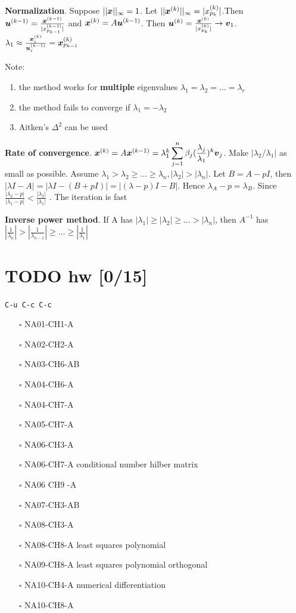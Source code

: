 \documentclass[11pt]{article}
\begin{document}
\textbf{Normalization}. Suppose \(||\boldsymbol{x}||_\infty=1\). Let
\(||\boldsymbol{x}^{(k)}||_\infty=|x_{p_k}^{(k)}|\).Then \(\boldsymbol{u}^{(k-1)}=
   \frac{\boldsymbol{x}^{(k-1)}}{|x_{p_{k-1}}^{(k-1)}|}\) and
\(\boldsymbol{x}^{(k)}=A\boldsymbol{u}^{(k-1)}\).
Then \(\boldsymbol{u}^{(k)}= \frac{\boldsymbol{x}^{(k)}}{|x_{p_k}^{(k)}|}\to \boldsymbol{v}_1\).
\(\lambda_1\approx
   \frac{\boldsymbol{x}_i^{(k)}}{\boldsymbol{u}_i^{(k-1)}}=\boldsymbol{x}_{p_{k-1}}^{(k)}\)

Note:
\begin{enumerate}
\item the method works for \textbf{multiple} eigenvalues
\(\lambda_1=\lambda_2=\dots=\lambda_r\)
\item the method fails to converge if \(\lambda_1=-\lambda_2\)
\item Aitken's \(\Delta^2\) can be used
\end{enumerate}


\textbf{Rate of convergence}. \(\boldsymbol{x}^{(k)}=A\boldsymbol{x}^{(k-1)}=\lambda_1^k
   \displaystyle\sum_{j=1}^n\beta_j(\frac{\lambda_j}{\lambda_1})^k\boldsymbol{v}_j\).
Make \(|\lambda_2/\lambda_1|\) as small as possible.
Assume \(\lambda_1>\lambda_2\ge\dots\ge\lambda_n, |\lambda_2|>|\lambda_n|\).
Let \(B=A-pI\), then \(|\lambda I-A|=|\lambda I-(B+pI)|=|(\lambda-p)I-B|\).
Hence \(\lambda_A-p=\lambda_B\). Since  \(\frac{|\lambda_2-p|}{|\lambda_1-p|}<
   \frac{|\lambda_2|}{|\lambda_1|}\) . The iteration is fast


\textbf{Inverse power method}. If A has
\(|\lambda_1|\ge|\lambda_2|\ge\dots>|\lambda_n|\), then \(A^{-1}\) has
\(|\frac{1}{\lambda_n}|>| \frac{1}{\lambda_{n-1}}|\ge\dots\ge|
   \frac{1}{\lambda_1}|\) 

\section{{\bfseries\sffamily TODO} hw [0/15]}
\label{sec:org5db9d9a}
\texttt{C-u C-c C-c}
\begin{itemize}
\item[{$\square$}] NA01-CH1-A
\item[{$\square$}] NA02-CH2-A
\item[{$\square$}] NA03-CH6-AB
\item[{$\square$}] NA04-CH6-A
\item[{$\square$}] NA04-CH7-A
\item[{$\square$}] NA05-CH7-A
\item[{$\square$}] NA06-CH3-A
\item[{$\square$}] NA06-CH7-A
conditional number
hilber matrix
\item[{$\square$}] NA06 CH9 -A
\item[{$\square$}] NA07-CH3-AB
\item[{$\square$}] NA08-CH3-A
\item[{$\square$}] NA08-CH8-A
least squares polynomial

\item[{$\square$}] NA09-CH8-A
least squares polynomial orthogonal
\item[{$\square$}] NA10-CH4-A
numerical differentiation
\item[{$\square$}] NA10-CH8-A
\end{itemize}
\end{document}
